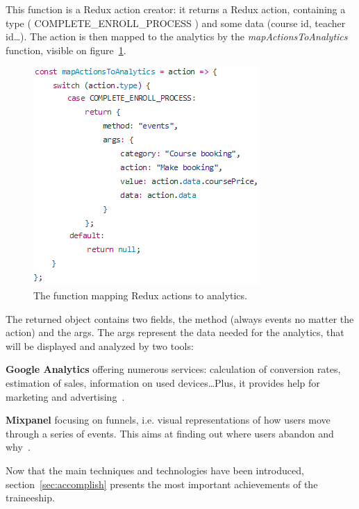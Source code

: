 This function is a Redux action creator: it returns a Redux action, containing a type (\guillemotleft{} COMPLETE\_ENROLL\_PROCESS \guillemotright{}) and some data (course id, teacher id\ldots). The action is then mapped to the analytics by the \textit{mapActionsToAnalytics} function, visible on {\sc figure}~\ref{fig:mapActions}.

\begin{figure}[H]
    \centering
    \includegraphics[scale=0.8]{figure/mapActions.png}
    \caption{The function mapping Redux actions to analytics.}
    \label{fig:mapActions}
\end{figure}

The returned object contains two fields, the method (always \guillemotleft{} events \guillemotright{} no matter the action) and the args. The args represent the data needed for the analytics, that will be displayed and analyzed by two tools: 

\textbf{Google Analytics} offering numerous services: calculation of conversion rates, estimation of sales, information on used devices\ldots Plus, it provides help for marketing and advertising~\cite{googleAnalytics}. 

\textbf{Mixpanel} focusing on funnels, i.e. visual representations of how users move through a series of events. This aims at finding out where users abandon and why~\cite{mixpanel}.

Now that the main techniques and technologies have been introduced, {\sc section}~\ref{sec:accomplish} presents the most important achievements of the traineeship.